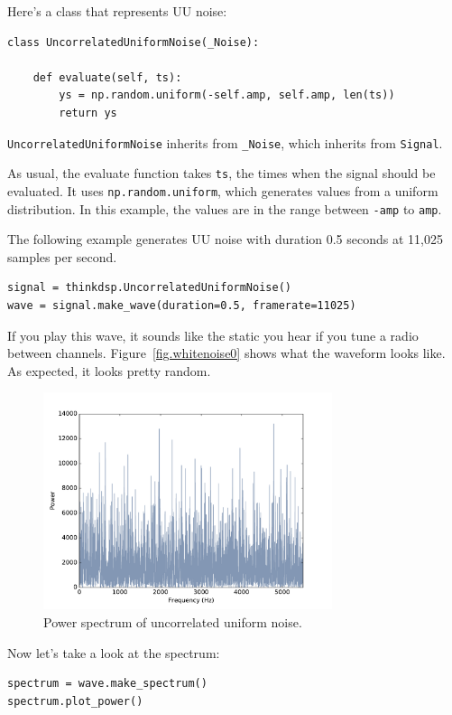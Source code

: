 \documentclass[12pt]{book}
\begin{document}
Here's a class that represents UU noise:

\begin{verbatim}
class UncorrelatedUniformNoise(_Noise):

    def evaluate(self, ts):
        ys = np.random.uniform(-self.amp, self.amp, len(ts))
        return ys
\end{verbatim}

{\tt UncorrelatedUniformNoise} inherits from \verb"_Noise", which
inherits from {\tt Signal}.

As usual, the evaluate function takes {\tt ts}, the times when the
signal should be evaluated.  It uses
{\tt np.random.uniform}, which generates values from a
uniform distribution.  In this example, the values are in
the range between {\tt -amp} to {\tt amp}.

The following example generates UU noise with duration 0.5
seconds at 11,025 samples per second.

\begin{verbatim}
signal = thinkdsp.UncorrelatedUniformNoise()
wave = signal.make_wave(duration=0.5, framerate=11025)
\end{verbatim}

If you play this wave, it sounds like the static you hear if you tune
a radio between channels.  Figure~\ref{fig.whitenoise0} shows what the
waveform looks like.  As expected, it looks pretty random.

\begin{figure}
\centerline{\includegraphics[height=2.5in]{figs/whitenoise1.pdf}}
\caption{Power spectrum of uncorrelated uniform noise.}
\label{fig.whitenoise1}
\end{figure}

Now let's take a look at the spectrum:

\begin{verbatim}
spectrum = wave.make_spectrum()
spectrum.plot_power()
\end{verbatim}
\end{document}
